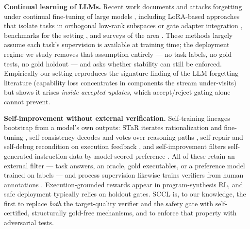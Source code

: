 \documentclass[10pt,conference]{IEEEtran}
\begin{document}
\textbf{Continual learning of LLMs.} Recent work documents and attacks forgetting under continual fine-tuning of large models \cite{luo2025forgetting,luo2023investigating}, including LoRA-based approaches that isolate tasks in orthogonal low-rank subspaces \cite{olora} or gate adapter integration \cite{gil}, benchmarks for the setting \cite{trace}, and surveys of the area \cite{shi2025survey}. These methods largely assume each task's supervision is available at training time; the deployment regime we study removes that assumption entirely --- no task labels, no gold tests, no gold holdout --- and asks whether stability can still be enforced. Empirically our setting reproduces the signature finding of the LLM-forgetting literature (capability loss concentrates in components the stream under-visits) but shows it arises \emph{inside accepted updates}, which accept/reject gating alone cannot prevent.

\textbf{Self-improvement without external verification.} Self-training lineages bootstrap from a model's own outputs: STaR iterates rationalization and fine-tuning \cite{zelikman2022star}, self-consistency decodes and votes over reasoning paths \cite{wang2022self}, self-repair and self-debug recondition on execution feedback \cite{chen2024teaching}, and self-improvement filters self-generated instruction data by model-scored preference \cite{selfimprove}. All of these retain an external filter --- task answers, an oracle, gold executables, or a preference model trained on labels --- and process supervision likewise trains verifiers from human annotations \cite{verify}. Execution-grounded rewards appear in program-synthesis RL, and safe deployment typically relies on holdout gates. SCCL is, to our knowledge, the first to replace \emph{both} the target-quality verifier and the safety gate with self-certified, structurally gold-free mechanisms, and to enforce that property with adversarial tests.
\end{document}
